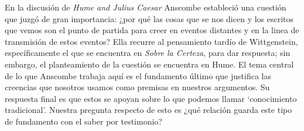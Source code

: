 En la discusión de \emph{Hume and Julius Caesar} Anscombe estableció una cuestión que juzgó de gran importancia: ¿por qué las cosas que se nos dicen y los escritos que vemos son el punto de partida para creer en eventos distantes y en la linea de transmisión de estos eventos? Ella recurre al pensamiento tardío de Wittgenstein, específicamente el que se encuentra en \emph{Sobre la Certeza}, para dar respuesta; sin embargo, el planteamiento de la cuestión se encuentra en Hume. El tema central de lo que Anscombe trabaja aquí es el fundamento último que justifica las creencias que nosotros usamos como premisas en nuestros argumentos. Su respuesta final es que estos se apoyan sobre lo que podemos llamar `conocimiento tradicional'. Nuestra pregunta respecto de esto es ¿qué relación guarda este tipo de fundamento con el saber por testimonio?

